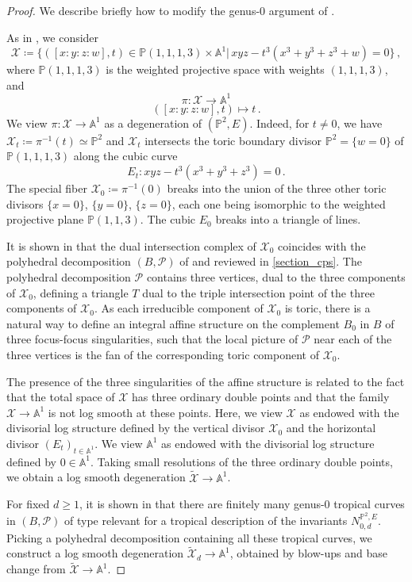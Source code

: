 \documentclass[11pt,letterpaper]{amsart}
\newcommand\A{\mathbb A}
\newcommand\PP{\mathbb P}
\newcommand\cP{\mathcal P}
\newcommand\cX{\mathcal X}
\begin{document}
\begin{proof}
We describe briefly how to modify the genus-$0$ argument of
\cite{gabele2019tropical}.

As in \cite{gabele2019tropical}, we consider 
\[ \cX \coloneq \{ ([x:y:z:w], t) \in \PP(1,1,1,3) \times 
\A^1 |\, xyz-t^3(x^3+y^3+z^3+w)=0\}\,,\]
where $\PP(1,1,1,3)$ is the weighted projective space with weights $(1,1,1,3)$,
and 
\[ \pi \colon \cX \rightarrow \A^1 \]
\[ ([x:y:z:w],t) \mapsto t \,.\]
We view $\pi \colon \cX \rightarrow \A^1$ as a degeneration of $(\PP^2,E)$.
Indeed, for $t \neq 0$, we have $\cX_t \coloneq \pi^{-1}(t) \simeq \PP^2$ and $\cX_t$ intersects the toric boundary divisor 
$\PP^2=\{ w=0\}$ of $\PP(1,1,1,3)$
along the cubic curve 
\[ E_t: xyz-t^3(x^3+y^3+z^3)=0\,.\] 
The special fiber $\cX_0 \coloneq \pi^{-1}(0)$ breaks into the union of the three other toric divisors 
$\{x=0\}$, $\{y=0\}$, $\{z=0\}$, each one being isomorphic to the weighted projective plane 
$\PP(1,1,3)$. The cubic $E_0$
breaks into a triangle of lines.

It is shown in \cite{gabele2019tropical}
that the dual intersection complex of 
$\cX_0$ coincides with the polyhedral decomposition  $(B, \mathscr{P})$ of 
\cite[Example 2.4]{cps} and reviewed in \cref{section_cps}. The polyhedral decomposition 
$\cP$ contains three vertices, dual to the 
three components of $\cX_0$, defining a triangle $T$ dual to the triple intersection point of the three components of $\cX_0$. 
As each irreducible component of $\cX_0$ is toric, there is a natural way to define an integral affine structure on the complement $B_0$ in $B$ of three focus-focus singularities,
such that the local picture of $\cP$ near each of the three vertices is the fan of the corresponding toric component of 
$\cX_0$. 

The presence of the three singularities of the affine structure is related to the fact that the total space of $\cX$ has three ordinary double points and that the family $\cX \rightarrow \A^1$
is not log smooth at these points. Here, we view $\cX$ as endowed with the divisorial log structure defined by the vertical divisor $\cX_0$ and the horizontal divisor $(E_t)_{t \in \A^1}$. We view $\A^1$ as endowed with the divisorial log structure defined by $0 \in \A^1$.
Taking small resolutions of the three ordinary double points, we obtain a log smooth degeneration $\tilde{\cX} \rightarrow \A^1$.

For fixed $d \geqslant 1$, it is shown in \cite{gabele2019tropical} that there are finitely many genus-$0$ tropical curves in $(B,\mathscr{P})$ of type relevant for a tropical description of the invariants $N_{0,d}^{\PP^2,E}$. Picking a polyhedral decomposition containing all these tropical curves, we construct a log smooth degeneration 
$\tilde{\cX}_d \rightarrow \A^1$, obtained by blow-ups and base change from $\tilde{\cX} \rightarrow \A^1$.


\end{proof}
\end{document}

